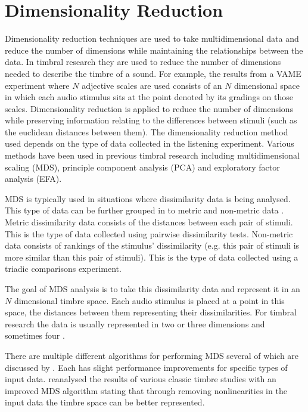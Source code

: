 	\section{Dimensionality Reduction}
	\label{sec:Timbre-Parameterisation-DimensionalityReduction}
		Dimensionality reduction techniques are used to take multidimensional data and reduce the number of
		dimensions while maintaining the relationships between the data. In timbral research they are used to reduce
		the number of dimensions needed to describe the timbre of a sound. For example, the results from a VAME
		experiment where $N$ adjective scales are used consists of an $N$ dimensional space in which each audio
		stimulus sits at the point denoted by its gradings on those scales. Dimensionality reduction is applied to
		reduce the number of dimensions while preserving information relating to the differences between stimuli
		(such as the euclidean distances between them). The dimensionality reduction method used depends on the type
		of data collected in the listening experiment.  Various methods have been used in previous timbral research
		including multidimensional scaling (MDS), principle component analysis (PCA) and exploratory factor analysis
		(EFA).

		MDS is typically used in situations where dissimilarity data is being analysed. This type of data can be
		further grouped in to metric and non-metric data \citep{hair2013multivariate}. Metric dissimilarity data
		consists of the distances between each pair of stimuli. This is the type of data collected using pairwise
		dissimilarity tests. Non-metric data consists of rankings of the stimulus' dissimilarity (e.g. this pair of
		stimuli is more similar than this pair of stimuli). This is the type of data collected using a triadic
		comparisons experiment.

		The goal of MDS analysis is to take this dissimilarity data and represent it in an $N$ dimensional timbre
		space.  Each audio stimulus is placed at a point in this space, the distances between them representing
		their dissimilarities. For timbral research the data is usually represented in two
		\citep{giragama2003relating} or three \citep{grey1978perceptual} dimensions and sometimes four
		\citep{bernays2011verbal}.
		
		There are multiple different algorithms for performing MDS several of which are discussed by
		\citet{mcadams1999perspectives}. Each has slight performance improvements for specific types of input data.
		\citet{burgoyne2008a} reanalysed the results of various classic timbre studies with an improved MDS
		algorithm stating that through removing nonlinearities in the input data the timbre space can be better
		represented.

